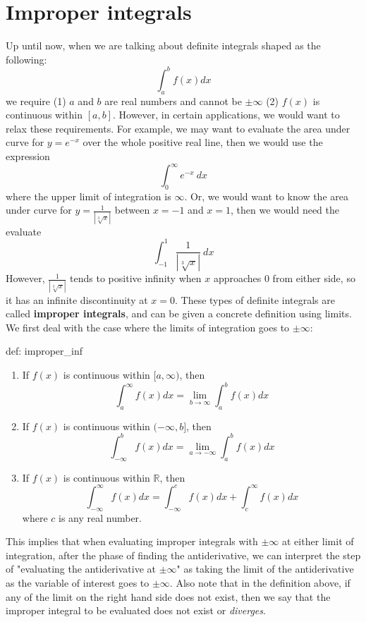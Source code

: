 \section{Improper integrals}
Up until now, when we are talking about definite integrals shaped as the following:
\[\int_a^b f(x) dx\]
we require (1) $a$ and $b$ are real numbers and cannot be $\pm \infty$ (2) $f(x)$ is continuous within $[a,b]$.  However, in certain applications, we would want to relax these requirements.  For example, we may want to evaluate the area under curve for $y = e^{-x}$ over the whole positive real line, then we would use the expression
\[\int_0^\infty e^{-x}~dx\]
where the upper limit of integration is $\infty$.  Or, we would want to know the area under curve for $y = \frac{1}{|\sqrt[3]{x}|}$ between $x = -1$ and $x = 1$, then we would need the evaluate
\[\int_{-1}^1 \frac{1}{|\sqrt[3]{x}|}~dx\]
However, $\frac{1}{|\sqrt[3]{x}|}$ tends to positive infinity when $x$ approaches $0$ from either side, so it has an infinite discontinuity at $x=0$.  These types of definite integrals are called \textbf{improper integrals}, and can be given a concrete definition using limits.  We first deal with the case where the limits of integration goes to $\pm \infty$:

\begin{defi}{def: improper_inf}
    \begin{enumerate}
        \item If $f(x)$ is continuous within $[a, \infty)$, then
        \[\int_a^{\infty} f(x)dx = \lim_{b \rightarrow \infty} \int_a^b f(x)dx\]
        \item If $f(x)$ is continuous within $(-\infty, b]$, then
        \[\int_{-\infty}^b f(x)dx = \lim_{a \rightarrow -\infty} \int_a^b f(x)dx\]
        \item If $f(x)$ is continuous within $\mathbb{R}$, then
        \[\int_{-\infty}^{\infty} f(x)dx = \int_{-\infty}^c f(x)dx + \int_c^{\infty} f(x)dx\]
        where $c$ is any real number.
    \end{enumerate}
\end{defi}

This implies that when evaluating improper integrals with $\pm \infty$ at either limit of integration, after the phase of finding the antiderivative, we can interpret the step of "evaluating the antiderivative at $\pm 
\infty$" as taking the limit of the antiderivative as the variable of interest goes to $\pm \infty$.  Also note that in the definition above, if any of the limit on the right hand side does not exist, then we say that the improper integral to be evaluated does not exist or \textit{diverges}.

